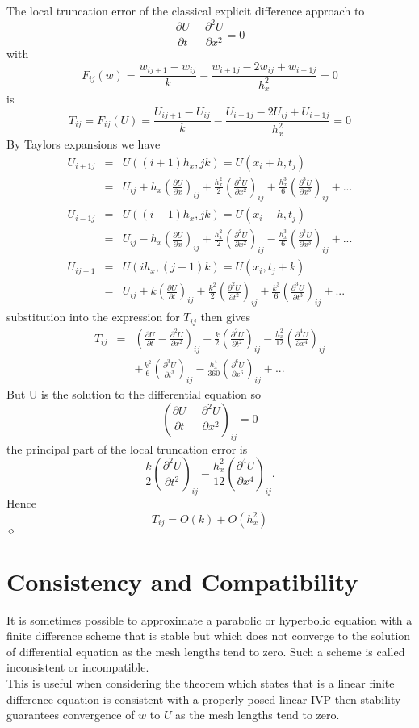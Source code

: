 \begin{example}
The local truncation error of the classical explicit difference approach to 
\[ \frac{\partial U}{\partial t} - \frac{\partial^2 U}{\partial x^2}=0\]
with
\[F_{ij}(w)=\frac{w_{ij+1}-w_{ij}}{k}-\frac{w_{i+1j}-2w_{ij}+w_{i-1j}}{h_x^2}=0
\]
is 
\[T_{ij}=F_{ij}(U)=\frac{U_{ij+1}-U_{ij}}{k}-\frac{U_{i+1j}-2U_{ij}+U_{i-1j}}{h_x^2}=0\]
By Taylors expansions we have
\begin{eqnarray*}
U_{i+1j}&=&U((i+1)h_x,jk)=U(x_i+h,t_j)\\
&=&U_{ij}+h_x\left(\frac{\partial U}{\partial x} \right)_{ij}+\frac{h_x^2}{2}\left(\frac{\partial^2 U}{\partial x^2} \right)_{ij}+\frac{h_x^3}{6}\left(\frac{\partial^3 U}{\partial x^3} \right)_{ij} +...\\
U_{i-1j}&=&U((i-1)h_x,jk)=U(x_i-h,t_j)\\
&=&U_{ij}-h_x\left(\frac{\partial U}{\partial x} \right)_{ij}+\frac{h_x^2}{2}\left(\frac{\partial^2 U}{\partial x^2} \right)_{ij}-\frac{h_x^3}{6}\left(\frac{\partial^3 U}{\partial x^3} \right)_{ij} +...\\
U_{ij+1}&=&U(ih_x,(j+1)k)=U(x_i,t_j+k)\\
&=&U_{ij}+k\left(\frac{\partial U}{\partial t} \right)_{ij}+\frac{k^2}{2}\left(\frac{\partial^2 U}{\partial t^2} \right)_{ij}+\frac{k^3}{6}\left(\frac{\partial^3 U}{\partial t^3} \right)_{ij} +...
\end{eqnarray*}
substitution into the expression for $T_{ij}$ then gives
\begin{eqnarray*}
T_{ij}&=&\left(\frac{\partial U}{\partial t} - \frac{\partial^2 U}{\partial x^2} \right)_{ij}+\frac{k}{2}\left(\frac{\partial^2 U}{\partial t^2} \right)_{ij}
-\frac{h_x^2}{12}\left(\frac{\partial^4 U}{\partial x^4} \right)_{ij}\\
& &	+\frac{k^2}{6}\left(\frac{\partial^3 U}{\partial t^3} \right)_{ij}
-\frac{h_x^4}{360}\left(\frac{\partial^6 U}{\partial x^6} \right)_{ij}+ ...
\end{eqnarray*}
But U is the solution to the differential equation so
\[\left(\frac{\partial U}{\partial t} - \frac{\partial^2 U}{\partial x^2} \right)_{ij}=0 \]
the principal part of the local truncation error is 
\[ \frac{k}{2}\left(\frac{\partial^2 U}{\partial t^2} \right)_{ij}
-\frac{h_x^2}{12}\left(\frac{\partial^4 U}{\partial x^4} \right)_{ij}.\]
Hence
\[T_{ij}=O(k)+O(h_x^2)\]
$\diamond$
\end{example}
\section{Consistency and Compatibility}
It is sometimes possible to approximate a parabolic or hyperbolic equation with a
finite difference scheme that is stable but which does not converge to the solution
of differential equation as the mesh lengths tend to zero.  Such a scheme is called inconsistent or incompatible.\\
This is useful when considering the theorem which states that is a linear finite
difference equation is consistent with a properly posed linear IVP then stability guarantees convergence of $w$ to $U$ as the mesh lengths tend to zero.

